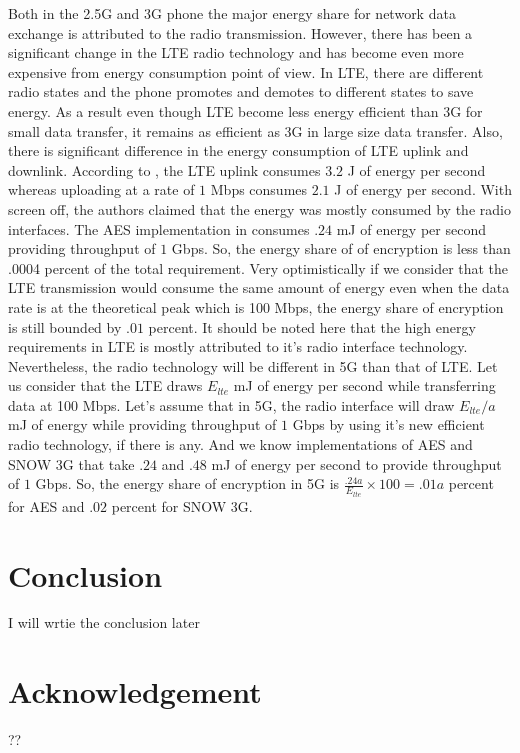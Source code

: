 \documentclass[lnicst,sechang,a4paper]{svmultln}
\begin{document}
Both in the 2.5G and 3G phone the major energy share for network data exchange is attributed to the radio transmission. However, there has been a significant change in the LTE radio technology and has become even more expensive from energy consumption point of view. In LTE, there are different radio states and the phone promotes and demotes to different states to save energy. As a result even though LTE become less energy efficient than 3G for small data transfer, it remains as efficient as 3G in large size data transfer. Also, there is significant difference in the energy consumption of LTE uplink and downlink. According to \cite{Mobisys_2012}, the LTE uplink consumes $3.2$ J of energy per second whereas uploading at a rate of $1$ Mbps consumes $2.1$ J of energy per second. With screen off, the authors claimed that the energy was mostly consumed by the radio interfaces. The AES implementation in \cite{Ruhr_2011} consumes $.24$ mJ of energy per second providing throughput of $1$ Gbps. So, the energy share of of encryption is less than .0004 percent of the total requirement. Very optimistically if we consider that the LTE transmission would consume the same amount of energy even when the data rate is at the theoretical peak which is 100 Mbps, the energy share of encryption is still bounded by $.01$ percent. It should be noted here that the high energy requirements in LTE is mostly attributed to it's radio interface technology. Nevertheless, the radio technology will be different in 5G than that of LTE. Let us consider that the LTE draws $E_{lte}$ mJ of energy per second while transferring data at 100 Mbps. Let's assume that in 5G, the radio interface will draw $E_{lte}/a$ mJ of energy while providing throughput of $1$ Gbps by using it's new efficient radio technology, if there is any. And we know implementations of AES and SNOW 3G that take $.24$ and $.48$ mJ of energy per second to provide throughput of $1$ Gbps. So, the energy share of encryption in 5G is $\frac{.24a}{E_{lte}}\times 100 = .01a$ percent for AES and $.02$ percent for SNOW 3G.

\section{Conclusion}
\label{sec:conclusion}
I will wrtie the conclusion later

\section{Acknowledgement}
\label{sec:acknowledgement}
??
\end{document}
